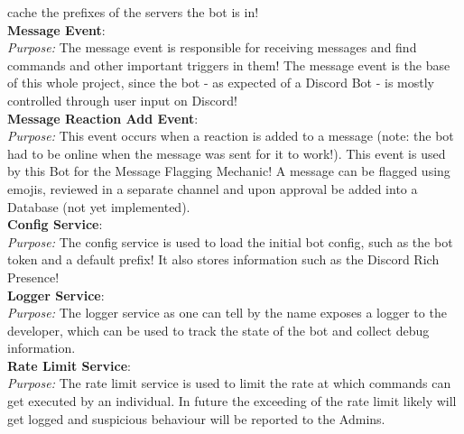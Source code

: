 \documentclass{tikzposter}
\begin{document}
\begin{columns}
{            cache the prefixes of the servers the bot is in!\\
            \textbf{Message Event}:\\
            \textit{Purpose:} The message event is responsible for receiving
            messages and find commands and other important triggers in them!
            The message event is the base of this whole project, since the bot
            - as expected of a Discord Bot - is mostly controlled through 
            user input on Discord!\\
            \textbf{Message Reaction Add Event}:\\
            \textit{Purpose:} This event occurs when a reaction is added to a 
            message (note: the bot had to be online when the message was sent
            for it to work!). This event is used by this Bot for the Message
            Flagging Mechanic! A message can be flagged using emojis, reviewed
            in a separate channel and upon approval be added into a Database 
            (not yet implemented).\vspace{2cm}\\
            \textbf{Config Service}:\\
            \textit{Purpose:} The config service is used to load the initial
            bot config, such as the bot token and a default prefix! It also 
            stores information such as the Discord Rich Presence!\\
            \textbf{Logger Service}:\\
            \textit{Purpose:} The logger service as one can tell by the name
            exposes a logger to the developer, which can be used to track 
            the state of the bot and collect debug information.\\
            \textbf{Rate Limit Service}:\\
            \textit{Purpose:} The rate limit service is used to limit the rate
            at which commands can get executed by an individual. In future the
            exceeding of the rate limit likely will get logged and suspicious
            behaviour will be reported to the Admins.
        }
    \end{columns}
\end{document}
